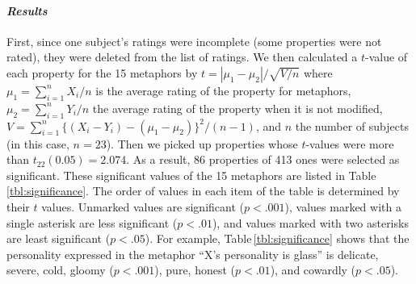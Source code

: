 \paragraph{\it Results}
First, since one subject's ratings were incomplete (some properties were not rated), 
they were deleted from the list of ratings.
We then calculated a $t$-value of each property for the 15 metaphors by 
$t=|\mu_1-\mu_2|/\sqrt{V/n}$
where $\mu_1=\sum_{i=1}^{n}X_i/n$ is the average rating of the property for metaphors,
$\mu_2=\sum_{i=1}^{n}Y_i/n$ the average rating of the property when it is not modified,
$V=\sum_{i=1}^n\{(X_i-Y_i)-(\mu_1-\mu_2)\}^2/(n-1)$, 
and $n$ the number of subjects (in this case, $n=23$).
Then we picked up properties whose $t$-values were more than $t_{22}(0.05)=2.074$.
As a result, 86 properties of 413 ones were selected as significant. 
These significant values of the 15 metaphors are listed in Table\,\ref{tbl:significance}.
The order of values in each item of the table is determined by their
$t$ values. Unmarked values are significant ($p<.001$), values
marked with a single asterisk are less significant ($p<.01$), and
values marked with two asterisks are least significant ($p<
.05$). For example, Table\,\ref{tbl:significance} shows that the
personality expressed in the metaphor ``X's personality is glass'' is
delicate, severe, cold, gloomy ($p<.001$), pure, honest ($p<.01$), and
cowardly ($p<.05$).

